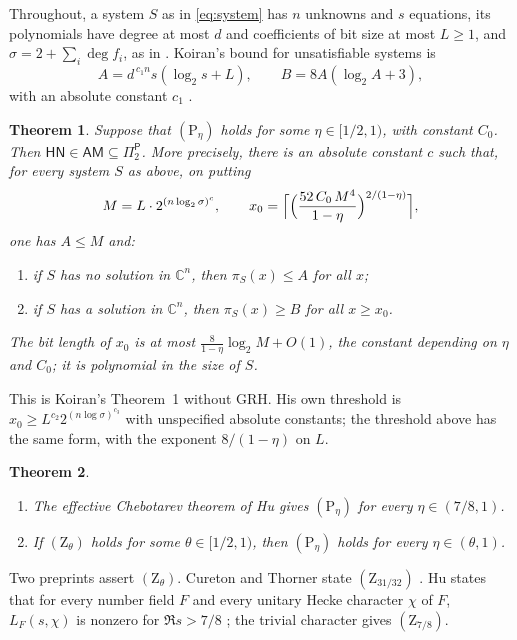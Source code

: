 \documentclass[11pt]{amsart}
\newtheorem{theorem}{Theorem}
\theoremstyle{definition}
\theoremstyle{remark}
\newcommand{\C}{\mathbb C}
\newcommand{\cl}[1]{\mathsf{#1}}
\newcommand{\HN}{\cl{HN}}
\newcommand{\AM}{\cl{AM}}
\newcommand{\Pitwo}{\Pi_2^{\cl P}}
\newcommand{\Zh}[1]{(\mathrm Z_{#1})}
\newcommand{\Ph}[1]{(\mathrm P_{#1})}
\begin{document}
Throughout, a system $S$ as in \eqref{eq:system} has $n$ unknowns and $s$ equations, its polynomials have degree at most $d$ and coefficients of bit size at most $L\ge1$, and $\sigma=2+\sum_i\deg f_i$, as in \cite[\S1.1]{K96}. Koiran's bound for unsatisfiable systems is
\begin{equation}\label{eq:A}
 A=d^{\,c_1n}s(\log_2s+L),\qquad B=8A(\log_2A+3),
\end{equation}
with an absolute constant $c_1$ \cite[Theorem~1]{K96}.

\begin{theorem}\label{thmA}
Suppose that $\Ph\eta$ holds for some $\eta\in[1/2,1)$, with constant $C_0$. Then $\HN\in\AM\subseteq\Pitwo$. More precisely, there is an absolute constant $c$ such that, for every system $S$ as above, on putting
\[
 M=L\cdot2^{(n\log_2\sigma)^{c}},\qquad
 x_0=\Bigl\lceil\Bigl(\frac{52\,C_0\,M^4}{1-\eta}\Bigr)^{2/(1-\eta)}\Bigr\rceil ,
\]
one has $A\le M$ and:
\begin{enumerate}
\item if $S$ has no solution in $\C^n$, then $\pi_S(x)\le A$ for all $x$;
\item if $S$ has a solution in $\C^n$, then $\pi_S(x)\ge B$ for all $x\ge x_0$.
\end{enumerate}
The bit length of $x_0$ is at most $\frac{8}{1-\eta}\log_2M+O(1)$, the constant depending on $\eta$ and $C_0$; it is polynomial in the size of $S$.
\end{theorem}

This is Koiran's Theorem~1 without GRH. His own threshold is $x_0\ge L^{c_2}2^{(n\log\sigma)^{c_3}}$ with unspecified absolute constants; the threshold above has the same form, with the exponent $8/(1-\eta)$ on $L$.

\begin{theorem}\label{thmB}
\begin{enumerate}
\item[(a)] The effective Chebotarev theorem of Hu \cite[Corollary~9.6, p.~56]{Hu} gives $\Ph\eta$ for every $\eta\in(7/8,1)$.
\item[(b)] If $\Zh\theta$ holds for some $\theta\in[1/2,1)$, then $\Ph\eta$ holds for every $\eta\in(\theta,1)$.
\end{enumerate}
\end{theorem}

Two preprints assert $\Zh\theta$. Cureton and Thorner state $\Zh{31/32}$ \cite[Theorem~1.1, p.~3]{CT}. Hu states that for every number field $F$ and every unitary Hecke character $\chi$ of $F$, $L_F(s,\chi)$ is nonzero for $\Re s>7/8$ \cite[Theorem~1.2, p.~2]{Hu}; the trivial character gives $\Zh{7/8}$.
\end{document}
